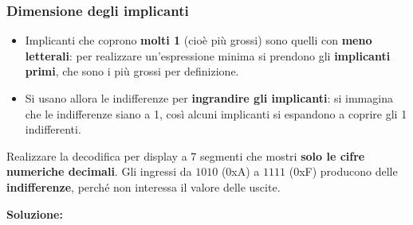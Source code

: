 \documentclass[12pt, a4paper]{article}
\begin{document}
\subsubsection{Dimensione degli implicanti}
\begin{itemize}
    \item Implicanti che coprono \textbf{molti 1} (cioè più grossi) sono quelli con \textbf{meno letterali}: per realizzare un'espressione minima si prendono gli \textbf{implicanti primi}, che sono i più grossi per definizione.
    \item Si usano allora le indifferenze per \textbf{ingrandire gli implicanti}: si immagina che le indifferenze siano a 1, così alcuni implicanti si espandono a coprire gli 1 indifferenti.
\end{itemize}

\begin{tcolorbox}[colback=lightergray!10, colframe=tocsec, title=\textbf{Esercizio: display a 7 segmenti solo con cifre decimali}]
Realizzare la decodifica per display a 7 segmenti che mostri \textbf{solo le cifre numeriche decimali}. Gli ingressi da $1010$ (0xA) a $1111$ (0xF) producono delle \textbf{indifferenze}, perché non interessa il valore delle uscite.
\end{tcolorbox}

\textbf{Soluzione:}
\end{document}
